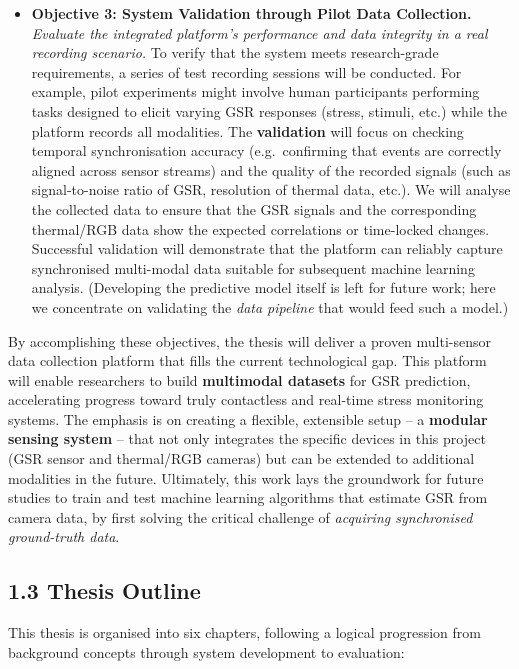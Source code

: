 \documentclass[12pt,a4paper]{article}
\begin{document}
\begin{itemize}
\item
  \textbf{Objective 3: System Validation through Pilot Data Collection.} \emph{Evaluate the integrated platform's performance and data integrity in a real recording scenario.} To verify that the system meets research-grade requirements, a series of test recording sessions will be conducted. For example, pilot experiments might involve human participants performing tasks designed to elicit varying GSR responses (stress, stimuli, etc.) while the platform records all modalities. The \textbf{validation} will focus on checking temporal synchronisation accuracy (e.g.~confirming that events are correctly aligned across sensor streams) and the quality of the recorded signals (such as signal-to-noise ratio of GSR, resolution of thermal data, etc.). We will analyse the collected data to ensure that the GSR signals and the corresponding thermal/RGB data show the expected correlations or time-locked changes. Successful validation will demonstrate that the platform can reliably capture synchronised multi-modal data suitable for subsequent machine learning analysis. (Developing the predictive model itself is left for future work; here we concentrate on validating the \emph{data pipeline} that would feed such a model.)
\end{itemize}

By accomplishing these objectives, the thesis will deliver a proven multi-sensor data collection platform that fills the current technological gap. This platform will enable researchers to build \textbf{multimodal datasets} for GSR prediction, accelerating progress toward truly contactless and real-time stress monitoring systems. The emphasis is on creating a flexible, extensible setup -- a \textbf{modular sensing system} -- that not only integrates the specific devices in this project (GSR sensor and thermal/RGB cameras) but can be extended to additional modalities in the future. Ultimately, this work lays the groundwork for future studies to train and test machine learning algorithms that estimate GSR from camera data, by first solving the critical challenge of \emph{acquiring synchronised ground-truth data}.

\subsection{1.3 Thesis Outline}\label{thesis-outline}

This thesis is organised into six chapters, following a logical progression from background concepts through system development to evaluation:
\end{document}
